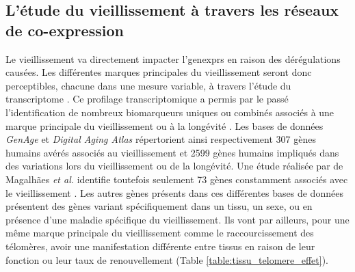 \subsection{L'étude du vieillissement à travers les réseaux de co-expression}

Le vieillissement va directement impacter l'\glspl{genexpr} en raison des dérégulations causées. Les différentes marques principales du vieillissement seront donc perceptibles, chacune dans une mesure variable, à travers l'étude du \gls{transcriptome} \cite{Saint2020Jun}. Ce profilage \gls{transcriptomique} a permis par le passé l'identification de nombreux biomarqueurs uniques ou combinés associés à une marque principale du vieillissement ou à la longévité \cite{Melzer2020}. Les bases de données \textit{GenAge} \cite{DeMagalhaes2004} et \textit{Digital Aging Atlas} \cite{Craig2015} répertorient ainsi respectivement 307 gènes humains avérés associés au vieillissement et 2599 gènes humains impliqués dans des variations lors du vieillissement ou de la longévité. Une étude réalisée par de Magalhães \textit{et al.} identifie toutefois seulement 73 gènes constamment associés avec le vieillissement \cite{DeMagalhaes2009intro}. Les autres gènes présents dans ces différentes bases de données présentent des gènes variant spécifiquement dans un tissu, un sexe, ou en présence d'une maladie spécifique du vieillissement. Ils vont par ailleurs, pour une même marque principale du vieillissement comme le raccourcissement des télomères, avoir une manifestation différente entre tissus en raison de leur fonction ou leur taux de renouvellement (Table \ref{table:tissu_telomere_effet}).

